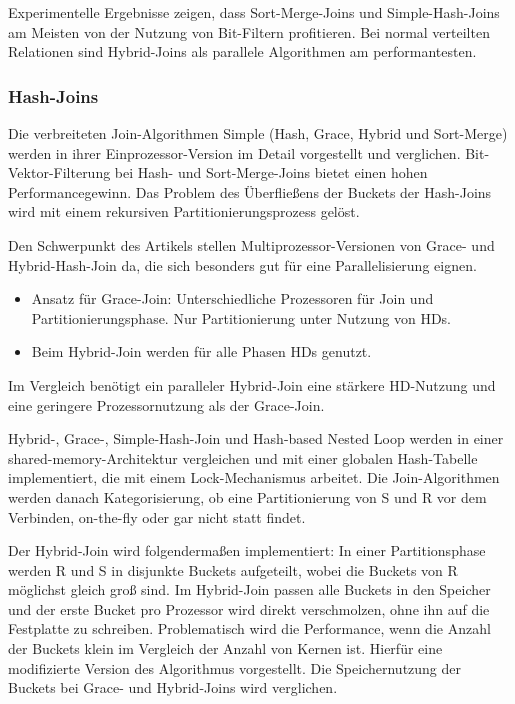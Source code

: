 \documentclass[a4paper,12pt,twoside]{article}
\begin{document}
Experimentelle Ergebnisse zeigen, dass Sort-Merge-Joins und Simple-Hash-Joins am Meisten von der Nutzung von Bit-Filtern profitieren. Bei normal verteilten Relationen sind Hybrid-Joins als parallele Algorithmen am performantesten. 

\subsubsection{Hash-Joins}

\textbf{}

Die verbreiteten Join-Algorithmen Simple (Hash, Grace, Hybrid und Sort-Merge) werden in ihrer Einprozessor-Version im Detail vorgestellt und verglichen. Bit-Vektor-Filterung bei Hash- und Sort-Merge-Joins bietet einen hohen Performancegewinn. Das Problem des Überfließens der Buckets der Hash-Joins wird mit einem rekursiven Partitionierungsprozess gelöst. 

Den Schwerpunkt des Artikels stellen Multiprozessor-Versionen von Grace- und Hybrid-Hash-Join da, die sich besonders gut für eine Parallelisierung eignen.

\begin{itemize}
	\item Ansatz für Grace-Join: Unterschiedliche Prozessoren für Join und Partitionierungsphase. Nur Partitionierung unter Nutzung von HDs.
	\item Beim Hybrid-Join werden für alle Phasen HDs genutzt.
\end{itemize}

Im Vergleich benötigt ein paralleler Hybrid-Join eine stärkere HD-Nutzung und eine geringere Prozessornutzung als der Grace-Join.

\textbf{}

Hybrid-, Grace-, Simple-Hash-Join und Hash-based Nested Loop werden in einer shared-memory-Architektur vergleichen und mit einer globalen Hash-Tabelle implementiert, die mit einem Lock-Mechanismus arbeitet. Die Join-Algorithmen werden danach Kategorisierung, ob eine Partitionierung von S und R vor dem Verbinden, on-the-fly oder gar nicht statt findet. 

Der Hybrid-Join wird folgendermaßen implementiert: In einer Partitionsphase werden R und S in disjunkte Buckets aufgeteilt, wobei die Buckets von R möglichst gleich groß sind. Im Hybrid-Join passen alle Buckets in den Speicher und der erste Bucket pro Prozessor wird direkt verschmolzen, ohne ihn auf die Festplatte zu schreiben. Problematisch wird die Performance, wenn die Anzahl der Buckets klein im Vergleich der Anzahl von Kernen ist. Hierfür eine modifizierte Version des Algorithmus vorgestellt. Die Speichernutzung der Buckets bei Grace- und Hybrid-Joins wird verglichen.
\end{document}
